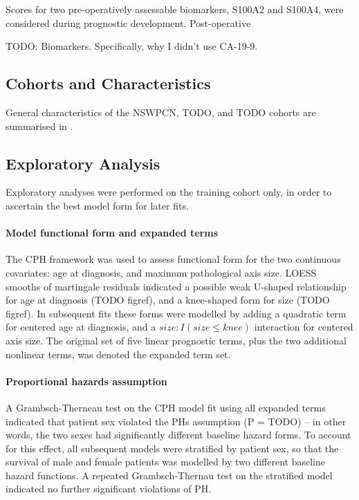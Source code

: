 \documentclass[dissertation.tex]{subfiles}
\begin{document}
Scores for two pre-operatively assessable biomarkers, S100A2 and S100A4, were considered during prognostic development.  Post-operative

TODO: Biomarkers.  Specifically, why I didn't use CA-19-9.

\subsection{Cohorts and Characteristics}
General characteristics of the \gls{NSWPCN}, TODO, and TODO cohorts are summarised in .

\subsection{Exploratory Analysis}
Exploratory analyses were performed on the training cohort only, in order to ascertain the best model form for later fits.

\paragraph{Model functional form and expanded terms}
The \gls{CPH} framework was used to assess functional form for the two continuous covariates: age at diagnosis, and maximum pathological axis size.  \gls{LOESS} smooths of martingale residuals indicated a possible weak U-shaped relationship for age at diagnosis (TODO figref), and a knee-shaped form for size (TODO figref).  In subsequent fits these forms were modelled by adding a quadratic term for centered age at diagnosis, and a $size:I(size \leq knee)$ interaction for centered axis size.  The original set of five linear prognostic terms, plus the two additional nonlinear terms, was denoted the expanded term set.

\paragraph{Proportional hazards assumption}
A Grambsch-Therneau test \cite{Grambsch1994} on the \gls{CPH} model fit using all expanded terms indicated that patient sex violated the \glspl{PH} assumption (P = TODO) -- in other words, the two sexes had significantly different baseline hazard forms.  To account for this effect, all subsequent models were stratified by patient sex, so that the survival of male and female patients was modelled by two different baseline hazard functions.  A repeated Grambsch-Thernau test on the stratified model indicated no further significant violations of \gls{PH}.
\end{document}
